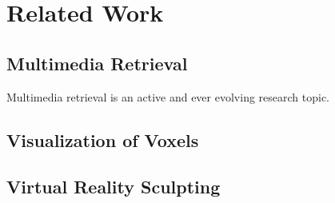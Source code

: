 \chapter{Related Work}

\section{Multimedia Retrieval}

Multimedia retrieval is an active and ever evolving research topic.


\section{Visualization of Voxels}


\section{Virtual Reality Sculpting}

